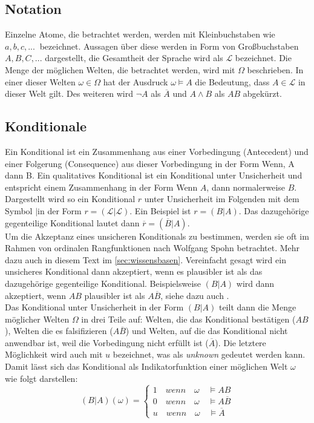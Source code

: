\documentclass[12pt,a4paper]{article}
\newcommand{\lag}{\mathcal{L}}
\begin{document}
\subsection{Notation}
Einzelne Atome, die betrachtet werden, werden mit Kleinbuchstaben wie $a, b, c,...\ $ bezeichnet. Aussagen über diese werden in Form von Großbuchstaben $A, B, C,...$ dargestellt, die Gesamtheit der Sprache wird als $\lag$ bezeichnet. Die Menge der möglichen Welten, die betrachtet werden, wird mit $\Omega$ beschrieben. In einer dieser Welten $\omega \in \Omega$  hat der Ausdruck $\omega \models A$ die Bedeutung, dass $A \in \lag$ in dieser Welt gilt. Des weiteren wird $\neg A$ als $\overline{A}$ und $A \wedge B$ als $AB$ abgekürzt.
\subsection{Konditionale}
Ein Konditional ist ein Zusammenhang aus einer Vorbedingung (Antecedent) und einer Folgerung (Consequence) aus dieser Vorbedingung in der Form \glqq Wenn, A dann B\grqq . Ein qualitatives Konditional ist ein Konditional unter Unsicherheit und entspricht einem Zusammenhang in der Form \glqq Wenn $A$, dann normalerweise $B$\grqq . Dargestellt wird so ein Konditional $r$ unter Unsicherheit im Folgenden mit dem Symbol \glqq$|$\grqq \space in der Form $r = ( \lag | \lag)$. Ein Beispiel ist $r = (B|A)$. Das dazugehörige gegenteilige Konditional lautet dann $\overline{r} = (\overline{B}|A)$.\\
Um die Akzeptanz eines unsicheren Konditionals zu bestimmen, werden sie oft im Rahmen von ordinalen Rangfunktionen nach Wolfgang Spohn betrachtet. Mehr dazu auch in diesem Text im  \autoref{sec:wissensbasen}. Vereinfacht gesagt wird ein unsicheres Konditional dann  akzeptiert, wenn es plausibler ist als das dazugehörige gegenteilige Konditional. Beispielsweise $(B|A)$ wird  dann akzeptiert, wenn $A B$ plausibler ist als $A \overline{B}$, siehe dazu auch \cite{isberner14}. \\
Das Konditional unter Unsicherheit in der Form $(B|A)$ teilt dann die Menge möglicher Welten $\Omega$ in drei Teile auf: Welten, die das Konditional bestätigen ($A B$), Welten die es falsifizieren ($A \overline{B}$) und Welten, auf die das Konditional nicht anwendbar ist, weil die Vorbedingung nicht erfüllt ist ($\overline{A}$). Die letztere Möglichkeit wird auch mit $u$ bezeichnet, was als \textit{unknown} gedeutet werden kann. Damit lässt sich das Konditional als Indikatorfunktion einer möglichen Welt $\omega$ wie folgt darstellen:
\[
  (B|A)(\omega)=\begin{cases}
               1 \quad wenn \quad \omega \quad \models AB\\
               0 \quad wenn \quad \omega \quad \models A\overline{B}\\
               u \quad wenn \quad \omega \quad \models \overline{A}
            \end{cases}
\]
\end{document}
